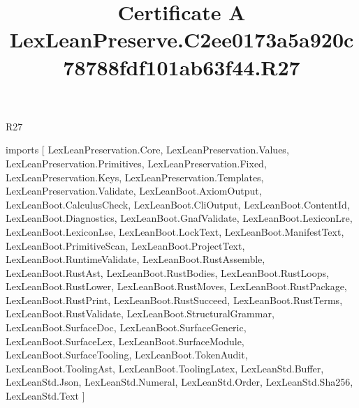 \begin{lexlean}{R27}
\title{Certificate A LexLeanPreserve.C2ee0173a5a920c78788fdf101ab63f44.R27}
\begin{coremodule}
imports [
  LexLeanPreservation.Core,
  LexLeanPreservation.Values,
  LexLeanPreservation.Primitives,
  LexLeanPreservation.Fixed,
  LexLeanPreservation.Keys,
  LexLeanPreservation.Templates,
  LexLeanPreservation.Validate,
  LexLeanBoot.AxiomOutput,
  LexLeanBoot.CalculusCheck,
  LexLeanBoot.CliOutput,
  LexLeanBoot.ContentId,
  LexLeanBoot.Diagnostics,
  LexLeanBoot.GnafValidate,
  LexLeanBoot.LexiconLre,
  LexLeanBoot.LexiconLse,
  LexLeanBoot.LockText,
  LexLeanBoot.ManifestText,
  LexLeanBoot.PrimitiveScan,
  LexLeanBoot.ProjectText,
  LexLeanBoot.RuntimeValidate,
  LexLeanBoot.RustAssemble,
  LexLeanBoot.RustAst,
  LexLeanBoot.RustBodies,
  LexLeanBoot.RustLoops,
  LexLeanBoot.RustLower,
  LexLeanBoot.RustMoves,
  LexLeanBoot.RustPackage,
  LexLeanBoot.RustPrint,
  LexLeanBoot.RustSucceed,
  LexLeanBoot.RustTerms,
  LexLeanBoot.RustValidate,
  LexLeanBoot.StructuralGrammar,
  LexLeanBoot.SurfaceDoc,
  LexLeanBoot.SurfaceGeneric,
  LexLeanBoot.SurfaceLex,
  LexLeanBoot.SurfaceModule,
  LexLeanBoot.SurfaceTooling,
  LexLeanBoot.TokenAudit,
  LexLeanBoot.ToolingAst,
  LexLeanBoot.ToolingLatex,
  LexLeanStd.Buffer,
  LexLeanStd.Json,
  LexLeanStd.Numeral,
  LexLeanStd.Order,
  LexLeanStd.Sha256,
  LexLeanStd.Text
]


\end{coremodule}
\end{lexlean}
